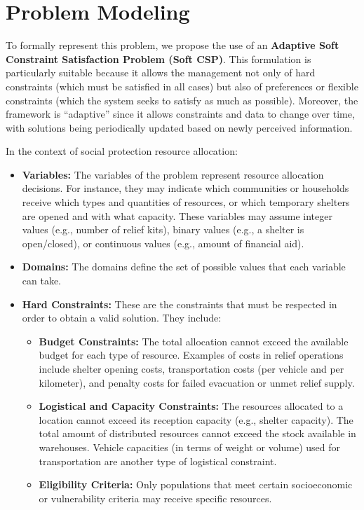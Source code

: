 \section{Problem Modeling}
To formally represent this problem, we propose the use of an \textbf{Adaptive Soft Constraint Satisfaction Problem (Soft CSP)}. This formulation is particularly suitable because it allows the management not only of hard constraints (which must be satisfied in all cases) but also of preferences or flexible constraints (which the system seeks to satisfy as much as possible). Moreover, the framework is “adaptive” since it allows constraints and data to change over time, with solutions being periodically updated based on newly perceived information.

In the context of social protection resource allocation:
\begin{itemize}
    \item \textbf{Variables:} The variables of the problem represent resource allocation decisions. For instance, they may indicate which communities or households receive which types and quantities of resources, or which temporary shelters are opened and with what capacity. These variables may assume integer values (e.g., number of relief kits), binary values (e.g., a shelter is open/closed), or continuous values (e.g., amount of financial aid).
    
    \item \textbf{Domains:} The domains define the set of possible values that each variable can take.

    \item \textbf{Hard Constraints:} These are the constraints that must be respected in order to obtain a valid solution. They include:
    \begin{itemize}
        \item \textbf{Budget Constraints:} The total allocation cannot exceed the available budget for each type of resource. Examples of costs in relief operations include shelter opening costs, transportation costs (per vehicle and per kilometer), and penalty costs for failed evacuation or unmet relief supply.
        \item \textbf{Logistical and Capacity Constraints:} The resources allocated to a location cannot exceed its reception capacity (e.g., shelter capacity). The total amount of distributed resources cannot exceed the stock available in warehouses. Vehicle capacities (in terms of weight or volume) used for transportation are another type of logistical constraint.
        \item \textbf{Eligibility Criteria:} Only populations that meet certain socioeconomic or vulnerability criteria may receive specific resources.
    \end{itemize}


\end{itemize}
